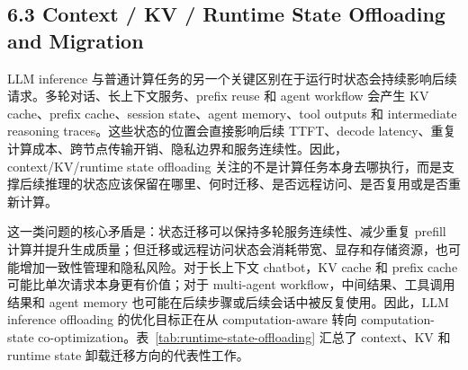 \subsection*{6.3 Context / KV / Runtime State Offloading and Migration}

LLM inference 与普通计算任务的另一个关键区别在于运行时状态会持续影响后续请求。多轮对话、长上下文服务、prefix reuse 和 agent workflow 会产生 KV cache、prefix cache、session state、agent memory、tool outputs 和 intermediate reasoning traces。这些状态的位置会直接影响后续 TTFT、decode latency、重复计算成本、跨节点传输开销、隐私边界和服务连续性。因此，context/KV/runtime state offloading 关注的不是计算任务本身去哪执行，而是支撑后续推理的状态应该保留在哪里、何时迁移、是否远程访问、是否复用或是否重新计算。


这一类问题的核心矛盾是：状态迁移可以保持多轮服务连续性、减少重复 prefill 计算并提升生成质量；但迁移或远程访问状态会消耗带宽、显存和存储资源，也可能增加一致性管理和隐私风险。对于长上下文 chatbot，KV cache 和 prefix cache 可能比单次请求本身更有价值；对于 multi-agent workflow，中间结果、工具调用结果和 agent memory 也可能在后续步骤或后续会话中被反复使用。因此，LLM inference offloading 的优化目标正在从 computation-aware 转向 computation-state co-optimization。表~\ref{tab:runtime-state-offloading} 汇总了 context、KV 和 runtime state 卸载迁移方向的代表性工作。


